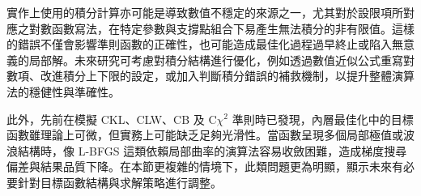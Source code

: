 \hspace*{8mm} 實作上使用的積分計算亦可能是導致數值不穩定的來源之一，尤其對於設限項所對應之對數函數寫法，在特定參數與支撐點組合下易產生無法積分的非有限值。這樣的錯誤不僅會影響準則函數的正確性，也可能造成最佳化過程過早終止或陷入無意義的局部解。未來研究可考慮對積分結構進行優化，例如透過數值近似公式重寫對數項、改進積分上下限的設定，或加入判斷積分錯誤的補救機制，以提升整體演算法的穩健性與準確性。

\hspace*{8mm} 此外，先前在模擬 CKL、CLW、CB 及 C$\chi^2$ 準則時已發現，內層最佳化中的目標函數雖理論上可微，但實務上可能缺乏足夠光滑性。當函數呈現多個局部極值或波浪結構時，像 L-BFGS 這類依賴局部曲率的演算法容易收斂困難，造成梯度搜尋偏差與結果品質下降。在本節更複雜的情境下，此類問題更為明顯，顯示未來有必要針對目標函數結構與求解策略進行調整。

